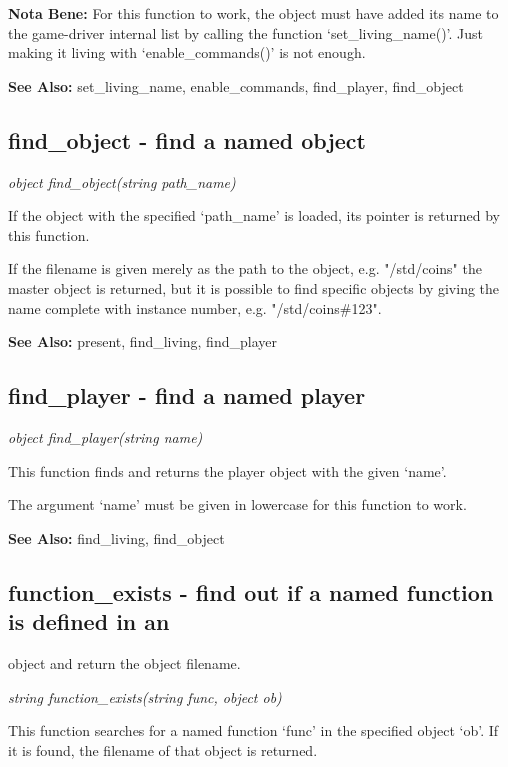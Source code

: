     {\bf Nota Bene: }   For this function to work, the object must have added its name 
    to the game-driver internal list by calling the function 
    `set\_living\_name()'. Just making it living with `enable\_commands()'
    is not enough.

    {\bf See Also: }    set\_living\_name, enable\_commands, find\_player, find\_object



\subsection{find\_object - find a named object}

    {\em object find\_object(string path\_name)}

    If the object with the specified `path\_name' is loaded, its
    pointer is returned by this function.

    If the filename is given merely as the path to the object,
    e.g. "/std/coins" the master object is returned, but it is
    possible to find specific objects by giving the name complete
    with instance number, e.g. "/std/coins\#123".

    {\bf See Also: }    present, find\_living, find\_player



\subsection{find\_player - find a named player}

    {\em object find\_player(string name)}

    This function finds and returns the player object with the given
    `name'. 

    The argument `name' must be given in lowercase for this function
    to work.

    {\bf See Also: }    find\_living, find\_object



\subsection{function\_exists - find out if a named function is defined in an}
              object and return the object filename.

    {\em string function\_exists(string func, object ob)}

    This function searches for a named function `func' in the specified
    object `ob'. If it is found, the filename of that object is returned.

